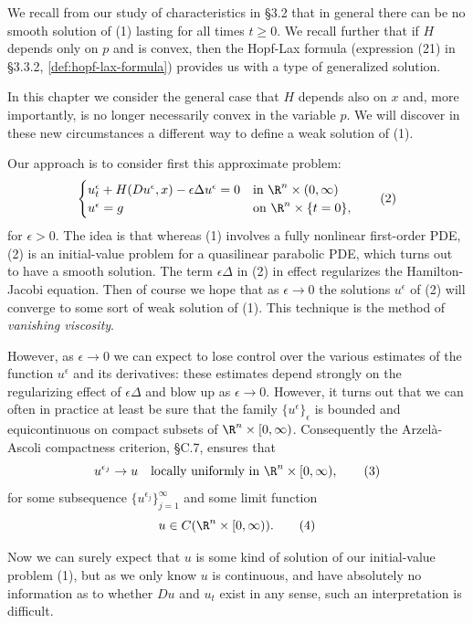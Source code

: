 We recall from our study of characteristics in \S3.2 that in general there can be no smooth solution of (1) lasting for all times $t \geq 0$. We recall further that if $H$ depends only on $p$ and is convex, then the Hopf-Lax formula (expression (21) in \S3.3.2, \cref{def:hopf-lax-formula}) provides us with a type of generalized solution.

In this chapter we consider the general case that $H$ depends also on $x$ and, more importantly, is no longer necessarily convex in the variable $p$. We will discover in these new circumstances a different way to define a weak solution of (1).

Our approach is to consider first this approximate problem:
\[
\begin{cases} u_t^\epsilon + H(Du^\epsilon, x) - \epsilon \Delta u^\epsilon = 0 & \text{in } \R^n \times (0, \infty) \\ u^\epsilon = g & \text{on } \R^n \times \{t = 0\}, \end{cases}
\tag{2}
\]
for $\epsilon > 0$. The idea is that whereas (1) involves a fully nonlinear first-order PDE, (2) is an initial-value problem for a quasilinear parabolic PDE, which turns out to have a smooth solution. The term $\epsilon \Delta$ in (2) in effect regularizes the Hamilton-Jacobi equation. Then of course we hope that as $\epsilon \to 0$ the solutions $u^\epsilon$ of (2) will converge to some sort of weak solution of (1). This technique is the method of \textit{vanishing viscosity}.

However, as $\epsilon \to 0$ we can expect to lose control over the various estimates of the function $u^\epsilon$ and its derivatives: these estimates depend strongly on the regularizing effect of $\epsilon \Delta$ and blow up as $\epsilon \to 0$. However, it turns out that we can often in practice at least be sure that the family $\{u^\epsilon\}_\epsilon$ is bounded and equicontinuous on compact subsets of $\R^n \times [0, \infty)$. Consequently the Arzel\`a-Ascoli compactness criterion, \S C.7, ensures that
\[
u^{\epsilon_j} \to u \quad \text{locally uniformly in } \R^n \times [0, \infty),
\tag{3}
\]
for some subsequence $\{u^{\epsilon_j}\}_{j=1}^\infty$ and some limit function
\[
u \in C(\R^n \times [0, \infty)).
\tag{4}
\]

Now we can surely expect that $u$ is some kind of solution of our initial-value problem (1), but as we only know $u$ is continuous, and have absolutely no information as to whether $Du$ and $u_t$ exist in any sense, such an interpretation is difficult.

